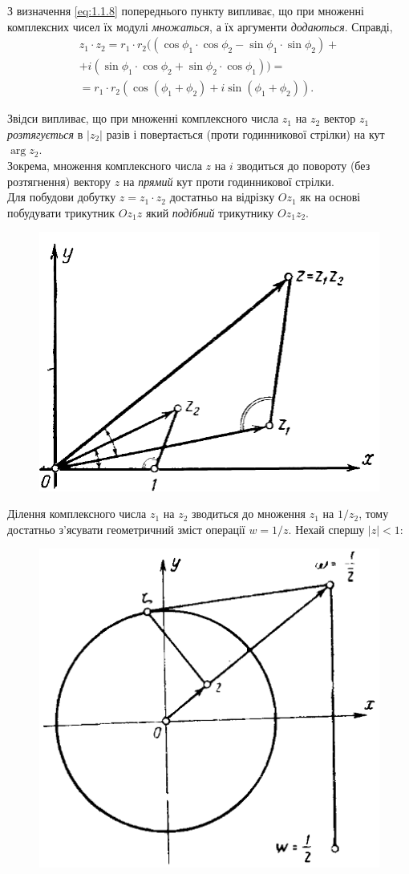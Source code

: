З визначення \eqref{eq:1.1.8} попереднього пункту випливає, що при множенні комплексних чисел їх модулі \textit{множаться}, а їх аргументи \textit{додаються}. Справді,
\begin{multline}
	\label{eq:1.2.5}
	z_1 \cdot z_2 = r_1 \cdot r_2 ((\cos \phi_1 \cdot \cos\phi_2 - \sin \phi_1 \cdot \sin \phi_2) + \\
	+ i (\sin \phi_1 \cdot \cos \phi_2 + \sin \phi_2 \cdot \cos \phi_1)) = \\
	= r_1 \cdot r_2 (\cos (\phi_1 + \phi_2) + i \sin (\phi_1 + \phi_2)).
\end{multline}

Звідси випливає, що при множенні комплексного числа $z_1$ на $z_2$ вектор $z_1$ \textit{розтягується} в $|z_2|$ разів і повертається (проти годинникової стрілки) на кут $\arg z_2$. \\

Зокрема, множення комплексного числа $z$ на $i$ зводиться до повороту (без розтягнення) вектору $z$ на \textit{прямий} кут проти годинникової стрілки. \\

Для побудови добутку $z = z_1 \cdot z_2$ достатньо на відрізку $Oz_1$ як на основі побудувати трикутник $Oz_1z$ який \textit{подібний} трикутнику $Oz_1z_2$. \\

\begin{figure}[H]
	\centering
	\includegraphics[width=.45\linewidth]{mal-02.png}
	\label{fig:2}
\end{figure}

Ділення комплексного числа $z_1$ на $z_2$ зводиться до множення $z_1$ на $1 / z_2$, тому достатньо з'ясувати геометричний зміст операції $w = 1 / z$. Нехай спершу $|z| < 1$:

\begin{figure}[H]
	\centering
	\includegraphics[width=.45\linewidth]{mal-03.png}
	\label{fig:3}
\end{figure}

